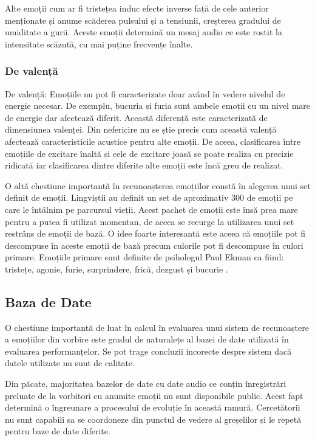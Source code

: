 \documentclass[9pt,shortpaper,twoside,web]{ieeecolor}
\begin{document}
Alte emoții cum ar fi tristețea induc efecte inverse față de cele anterior menționate și anume scăderea pulsului și a tensiunii, creșterea gradului de umiditate a gurii. Aceste emoții determină un mesaj audio ce este rostit la intensitate scăzută, cu mai puține frecvențe înalte.


\subsubsection{De valență} 
De valență: Emoțiile nu pot fi caracterizate doar având în vedere nivelul de energie necesar. De exemplu, bucuria și furia sunt ambele emoții cu un nivel mare de energie dar afectează diferit. Această diferență este caracterizată de dimensiunea valenței. Din nefericire nu se știe precis cum această valență afectează caracteristicile acustice pentru alte emoții. De aceea, clasificarea între emoțiile de excitare înaltă și cele de excitare joasă se poate realiza cu precizie ridicată iar clasificarea dintre diferite alte emoții este încă greu de realizat.

O altă chestiune importantă în recunoașterea emoțiilor constă în alegerea unui set definit de emoții. Lingviștii au definit un set de aproximativ 300 de emoții pe care le întâlnim pe parcursul vieții. Acest pachet de emoții este însă prea mare pentru a putea fi utilizat momentan, de aceea se recurge la utilizarea unui set restrâns de emoții de bază. O idee foarte interesantă este aceea că emoțiile pot fi descompuse în aceste emoții de bază precum culorile pot fi descompuse în culori primare. Emoțiile primare sunt definite de psihologul Paul Ekman ca fiind: tristețe, agonie, furie, surprindere, frică, dezgust și bucurie \cite{b6}.


\subsection{Baza de Date}
O chestiune importantă de luat în calcul în evaluarea unui sistem de recunoaștere a emoțiilor din vorbire este gradul de naturalețe al bazei de date utilizată în evaluarea performanțelor. Se pot trage concluzii incorecte despre sistem dacă datele utilizate nu sunt de calitate.

Din păcate, majoritatea bazelor de date cu date audio ce conțin înregistrări preluate de la vorbitori cu anumite emoții nu sunt disponibile public. Acest fapt determină o îngreunare a procesului de evoluție în această ramură. Cercetătorii nu sunt capabili sa se coordoneze din punctul de vedere al greșelilor și le repetă pentru baze de date diferite.
\end{document}
